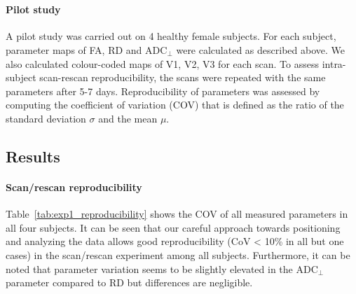 \begin{figure}

  \\
  \label{fig:erosion_se_effect}
\end{figure} 


\paragraph{Pilot study} A pilot study was carried out on 4 healthy female subjects. For each subject, parameter maps of FA, RD and ADC$_\perp$ were calculated as described above. We also calculated colour-coded maps of V1, V2, V3 for each scan. To assess intra-subject scan-rescan reproducibility, the scans were repeated with the same parameters after 5-7 days. Reproducibility of parameters was assessed by computing the coefficient of variation (COV) that is defined as the ratio of the standard deviation $\sigma$ and the mean $\mu$.

\subsection*{Results} 
\paragraph{Scan/rescan reproducibility} 
Table~\ref{tab:exp1_reproducibility} shows the COV of all measured parameters in all four subjects. It can be seen that our careful approach towards positioning and analyzing the data allows good reproducibility (CoV < 10\% in all but one cases) in the scan/rescan experiment among all subjects. Furthermore, it can be noted that parameter variation seems to be slightly elevated in the ADC$_\perp$ parameter compared to RD but differences are negligible.

